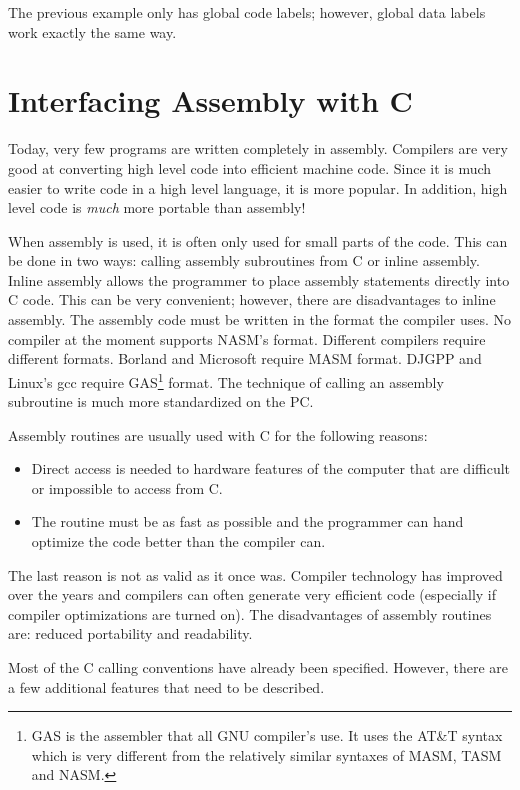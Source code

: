 The previous example only has global  code
labels; however, global data labels work exactly the same way.

\section{Interfacing Assembly with C}

Today, very few programs are written completely in assembly. Compilers are
very good at converting high level code into efficient machine code. Since
it is much easier to write code in a high level language, it is more popular.
In addition, high level code is \emph{much} more portable than assembly!

When assembly is used, it is often only used for small parts of the code.
This can be done in two ways: calling assembly subroutines from C or inline
assembly. Inline assembly allows the programmer to place assembly statements
directly into C code. This can be very convenient; however, there are 
disadvantages to inline assembly. The assembly code must be written
in the format the compiler uses. No compiler at the moment supports NASM's
format. Different compilers require different formats. Borland and Microsoft
require MASM format. DJGPP and Linux's gcc require GAS\footnote{GAS is the
assembler that all GNU compiler's use. It uses the AT\&T syntax which is
very different from the relatively similar syntaxes of MASM, TASM and NASM.}
format. The technique of calling an assembly subroutine is much more
standardized on the PC.

Assembly routines are usually used with C for the following reasons:
\begin{itemize}
\item Direct access is needed to hardware features of the computer that
      are difficult or impossible to access from C.
\item The routine must be as fast as possible and the programmer can
      hand optimize the code better than the compiler can.
\end{itemize}

The last reason is not as valid as it once was. Compiler technology has
improved over the years and compilers can often generate very efficient code
(especially if compiler optimizations are turned on). The disadvantages of
assembly routines are: reduced portability and readability.

Most of the C calling conventions have already been specified. However, there
are a few additional features that need to be described.

